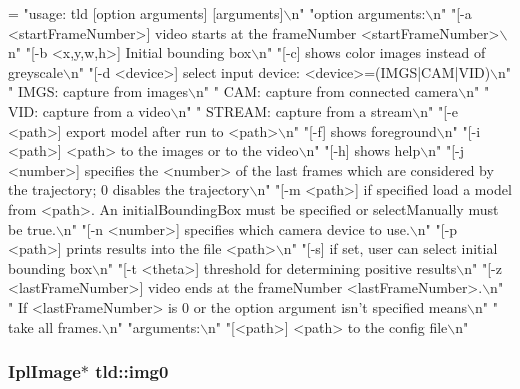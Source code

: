 \begin{DoxyCode}
=
    \textcolor{stringliteral}{"usage: tld [option arguments] [arguments]\(\backslash\)n"}
    \textcolor{stringliteral}{"option arguments:\(\backslash\)n"}
    \textcolor{stringliteral}{"[-a <startFrameNumber>] video starts at the frameNumber <startFrameNumber>\(\backslash\)n"}
    \textcolor{stringliteral}{"[-b <x,y,w,h>] Initial bounding box\(\backslash\)n"}
    \textcolor{stringliteral}{"[-c] shows color images instead of greyscale\(\backslash\)n"}
    \textcolor{stringliteral}{"[-d <device>] select input device: <device>=(IMGS|CAM|VID)\(\backslash\)n"}
    \textcolor{stringliteral}{"    IMGS: capture from images\(\backslash\)n"}
    \textcolor{stringliteral}{"    CAM: capture from connected camera\(\backslash\)n"}
    \textcolor{stringliteral}{"    VID: capture from a video\(\backslash\)n"}
    \textcolor{stringliteral}{"    STREAM: capture from a stream\(\backslash\)n"}
    \textcolor{stringliteral}{"[-e <path>] export model after run to <path>\(\backslash\)n"}
    \textcolor{stringliteral}{"[-f] shows foreground\(\backslash\)n"}
    \textcolor{stringliteral}{"[-i <path>] <path> to the images or to the video\(\backslash\)n"}
    \textcolor{stringliteral}{"[-h] shows help\(\backslash\)n"}
    \textcolor{stringliteral}{"[-j <number>] specifies the <number> of the last frames which are considered by the trajectory; 0
       disables the trajectory\(\backslash\)n"}
    \textcolor{stringliteral}{"[-m <path>] if specified load a model from <path>. An initialBoundingBox must be specified or
       selectManually must be true.\(\backslash\)n"}
    \textcolor{stringliteral}{"[-n <number>] specifies which camera device to use.\(\backslash\)n"}
    \textcolor{stringliteral}{"[-p <path>] prints results into the file <path>\(\backslash\)n"}
    \textcolor{stringliteral}{"[-s] if set, user can select initial bounding box\(\backslash\)n"}
    \textcolor{stringliteral}{"[-t <theta>] threshold for determining positive results\(\backslash\)n"}
    \textcolor{stringliteral}{"[-z <lastFrameNumber>] video ends at the frameNumber <lastFrameNumber>.\(\backslash\)n"}
    \textcolor{stringliteral}{"    If <lastFrameNumber> is 0 or the option argument isn't specified means\(\backslash\)n"}
    \textcolor{stringliteral}{"    take all frames.\(\backslash\)n"}
    \textcolor{stringliteral}{"arguments:\(\backslash\)n"}
    \textcolor{stringliteral}{"[<path>] <path> to the config file\(\backslash\)n"}
\end{DoxyCode}
\hypertarget{namespacetld_a32bc4295eda098201cd336e2d2f1e217}{
\subsubsection[{img0}]{\setlength{\rightskip}{0pt plus 5cm}Ipl\-Image$\ast$ tld\-::img0\hspace{0.3cm}{\ttfamily [static]}}}\label{namespacetld_a32bc4295eda098201cd336e2d2f1e217}
